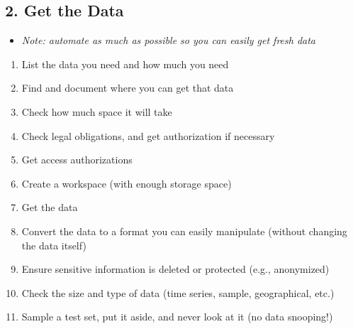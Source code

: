 \begin{slide}
\section[-2]{2. Get the Data}

\begin{PauseHighLight}
  \begin{itemize}\squeeze
  \item \emph{Note: automate as much as possible so you can easily get fresh
      data}\pause
  \end{itemize}
  \begin{enumerate}\squeeze
  \item List the data you need and how much you need\pause
  \item Find and document where you can get that data\pause
  \item Check how much space it will take\pause
  \item Check legal obligations, and get authorization if necessary\pause
  \item Get access authorizations\pause
  \item Create a workspace (with enough storage space)\pause
  \item Get the data\pause
  \item Convert the data to a format you can easily manipulate
    (without changing the data itself)\pause
  \item Ensure sensitive information is deleted or protected (e.g.,
    anonymized)\pause
  \item Check the size and type of data (time series, sample,
    geographical, etc.)\pause
  \item Sample a test set, put it aside, and never look at it (no data
    snooping!)\pause
  \end{enumerate}
\end{PauseHighLight}

\end{slide}



